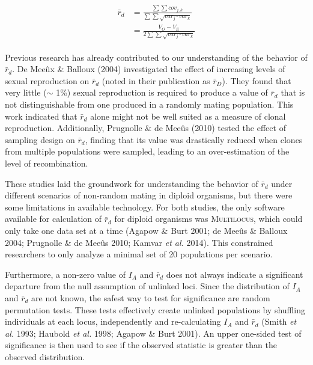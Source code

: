 \documentclass[]{article}
\theoremstyle{definition}
\theoremstyle{definition}
\theoremstyle{definition}
\theoremstyle{remark}
\begin{document}
\begin{align} %
\begin{split} %
\bar{r}_d &= \frac{\sum\sum{cov_{j,k}}}{
                   \sum\sum{\sqrt{var_{j} \cdot var_{k}}}} \\
          &= \frac{V_O - V_E}{2\sum\sum{\sqrt{var_{j} \cdot var_{k}}}}
\end{split}
\label{eq:rd}
\end{align}

Previous research has already contributed to our understanding of the
behavior of \(\bar{r}_d\). De Meeûx \& Balloux (2004) investigated the
effect of increasing levels of sexual reproduction on \(\bar{r}_d\)
(noted in their publication as \(\bar{r}_D\)). They found that very
little (\(\sim\) 1\%) sexual reproduction is required to produce a value
of \(\bar{r}_d\) that is not distinguishable from one produced in a
randomly mating population. This work indicated that \(\bar{r}_d\) alone
might not be well suited as a measure of clonal reproduction.
Additionally, Prugnolle \& de Meeûs (2010) tested the effect of sampling
design on \(\bar{r}_d\), finding that its value was drastically reduced
when clones from multiple populations were sampled, leading to an
over-estimation of the level of recombination.

These studies laid the groundwork for understanding the behavior of
\(\bar{r}_d\) under different scenarios of non-random mating in diploid
organisms, but there were some limitations in available technology. For
both studies, the only software available for calculation of
\(\bar{r}_d\) for diploid organisms was \textsc{Multilocus}, which could
only take one data set at a time (Agapow \& Burt 2001; de Meeûs \&
Balloux 2004; Prugnolle \& de Meeûs 2010; Kamvar \emph{et al.} 2014).
This constrained researchers to only analyze a minimal set of 20
populations per scenario.

Furthermore, a non-zero value of \(I_A\) and \(\bar{r}_d\) does not
always indicate a significant departure from the null assumption of
unlinked loci. Since the distribution of \(I_A\) and \(\bar{r}_d\) are
not known, the safest way to test for significance are random
permutation tests. These tests effectively create unlinked populations
by shuffling individuals at each locus, independently and re-calculating
\(I_A\) and \(\bar{r}_d\) (Smith \emph{et al.} 1993; Haubold \emph{et
al.} 1998; Agapow \& Burt 2001). An upper one-sided test of significance
is then used to see if the observed statistic is greater than the
observed distribution.
\end{document}
